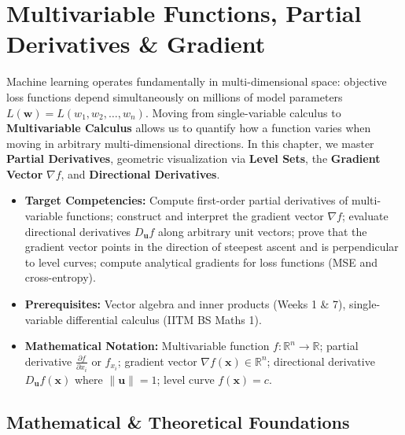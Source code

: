 \chapter{Multivariable Functions, Partial Derivatives \& Gradient}

Machine learning operates fundamentally in multi-dimensional space: objective loss functions depend simultaneously on millions of model parameters $L(\mathbf{w}) = L(w_1, w_2, \dots, w_n)$. Moving from single-variable calculus to \textbf{Multivariable Calculus} allows us to quantify how a function varies when moving in arbitrary multi-dimensional directions. In this chapter, we master \textbf{Partial Derivatives}, geometric visualization via \textbf{Level Sets}, the \textbf{Gradient Vector} $\nabla f$, and \textbf{Directional Derivatives}.

\vspace{0.5cm}
\begin{tcolorbox}[colback=primarylight, colframe=primarydark, title={\textbf{Executive Roadmap \& Learning Objectives}}]
\begin{itemize}
    \item \textbf{Target Competencies:} Compute first-order partial derivatives of multi-variable functions; construct and interpret the gradient vector $\nabla f$; evaluate directional derivatives $D_{\mathbf{u}} f$ along arbitrary unit vectors; prove that the gradient vector points in the direction of steepest ascent and is perpendicular to level curves; compute analytical gradients for loss functions (MSE and cross-entropy).
    \item \textbf{Prerequisites:} Vector algebra and inner products (Weeks 1 \& 7), single-variable differential calculus (IITM BS Maths 1).
    \item \textbf{Mathematical Notation:} Multivariable function $f: \mathbb{R}^n \to \mathbb{R}$; partial derivative $\frac{\partial f}{\partial x_i}$ or $f_{x_i}$; gradient vector $\nabla f(\mathbf{x}) \in \mathbb{R}^n$; directional derivative $D_{\mathbf{u}} f(\mathbf{x})$ where $\|\mathbf{u}\| = 1$; level curve $f(\mathbf{x}) = c$.
\end{itemize}
\end{tcolorbox}

\section{Mathematical \& Theoretical Foundations}

